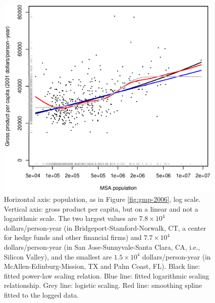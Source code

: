 \documentclass{pnastwo}
\begin{document}
\begin{figure}
\includegraphics[width=\columnwidth]{pcgmp-vs-pop-2006}
\caption{Horizontal axis: population, as in Figure \ref{fig:gmp-2006}, log
  scale.  Vertical axis: gross product per capita, but on a linear and not a
  logarithmic scale.  The two largest values are $7.8\times{10}^4$
  dollars/person-year (in Bridgeport-Stamford-Norwalk, CT, a center for hedge
  funds and other financial firms) and $7.7\times{10}^4$ dollars/person-year
  (in San Jose-Sunnyvale-Santa Clara, CA, i.e., Silicon Valley), and the
  smallest are $1.5\times{10}^4$ dollars/person-year (in
  McAllen-Edinburg-Mission, TX and Palm Coast, FL).  Black line: fitted
  power-law scaling relation.  Blue line: fitted logarithmic scaling
  relationship.  Grey line: logistic scaling.  Red line: smoothing spline
  fitted to the logged data.}
\label{fig:pcgmp-vs-pop-2006}
\end{figure}
\end{document}
